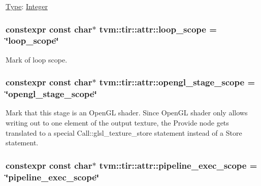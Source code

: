 \hyperlink{classtvm_1_1Type}{Type}\+: \hyperlink{classtvm_1_1Integer}{Integer} 
\subsubsection[{\texorpdfstring{loop\+\_\+scope}{loop_scope}}]{\setlength{\rightskip}{0pt plus 5cm}constexpr const char$\ast$ tvm\+::tir\+::attr\+::loop\+\_\+scope = \char`\"{}loop\+\_\+scope\char`\"{}}\hypertarget{namespacetvm_1_1tir_1_1attr_a9125ab905a93924ee79269aa808ed517}{}\label{namespacetvm_1_1tir_1_1attr_a9125ab905a93924ee79269aa808ed517}


Mark of loop scope. 

\subsubsection[{\texorpdfstring{opengl\+\_\+stage\+\_\+scope}{opengl_stage_scope}}]{\setlength{\rightskip}{0pt plus 5cm}constexpr const char$\ast$ tvm\+::tir\+::attr\+::opengl\+\_\+stage\+\_\+scope = \char`\"{}opengl\+\_\+stage\+\_\+scope\char`\"{}}\hypertarget{namespacetvm_1_1tir_1_1attr_ae486f902462321bf26244a9c5b19098c}{}\label{namespacetvm_1_1tir_1_1attr_ae486f902462321bf26244a9c5b19098c}


Mark that this stage is an Open\+GL shader. Since Open\+GL shader only allows writing out to one element of the output texture, the Provide node gets translated to a special Call\+::glsl\+\_\+texture\+\_\+store statement instead of a Store statement. 

\subsubsection[{\texorpdfstring{pipeline\+\_\+exec\+\_\+scope}{pipeline_exec_scope}}]{\setlength{\rightskip}{0pt plus 5cm}constexpr const char$\ast$ tvm\+::tir\+::attr\+::pipeline\+\_\+exec\+\_\+scope = \char`\"{}pipeline\+\_\+exec\+\_\+scope\char`\"{}}\hypertarget{namespacetvm_1_1tir_1_1attr_aee14d4d24b86179fd19938a02bc15512}{}\label{namespacetvm_1_1tir_1_1attr_aee14d4d24b86179fd19938a02bc15512}


